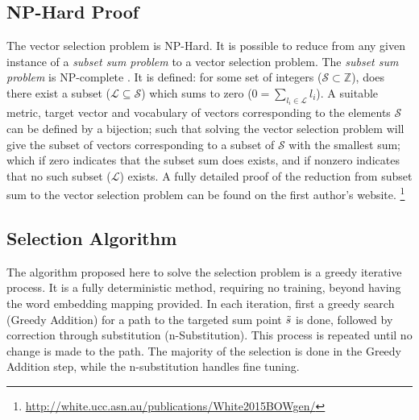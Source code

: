 {\subsection{NP-Hard Proof}
The vector selection problem is NP-Hard. It is possible to reduce from any given instance of a \emph{subset sum problem} to a vector selection problem. The \emph{subset sum problem} is NP-complete \parencite{karp1972reducibility}. It is defined: for some set of integers ($\mathcal{S}\subset\mathbb{Z}$), does there exist a subset ($\mathcal{L}\subseteq\mathcal{S}$) which sums to zero ($0=\sum_{l_i\in \mathcal{L}} l_i$).  A suitable metric, target vector and  vocabulary of vectors corresponding to the elements $\mathcal{S}$ can be defined by a bijection; such that solving the vector selection problem will give the subset of vectors corresponding to a subset of $\mathcal{S}$ with the smallest sum; which if zero indicates that the subset sum does exists, and if nonzero indicates that no such subset ($\mathcal{L}$) exists. A fully detailed proof of the reduction from subset sum to the vector selection problem can be found on the first author's website. \footnote{\url{http://white.ucc.asn.au/publications/White2015BOWgen/}}





\subsection{Selection Algorithm}
The algorithm proposed here to solve the selection problem is a greedy iterative process. It is a fully deterministic method, requiring no training, beyond having the word embedding mapping provided. In each iteration, first a greedy search (Greedy Addition) for a path to the targeted sum point $\tilde{s}$ is done, followed by correction through substitution (n-Substitution). This process is repeated until no change is made to the path. The majority of the selection is done in the Greedy Addition step, while the n-substitution handles fine tuning. 

}
